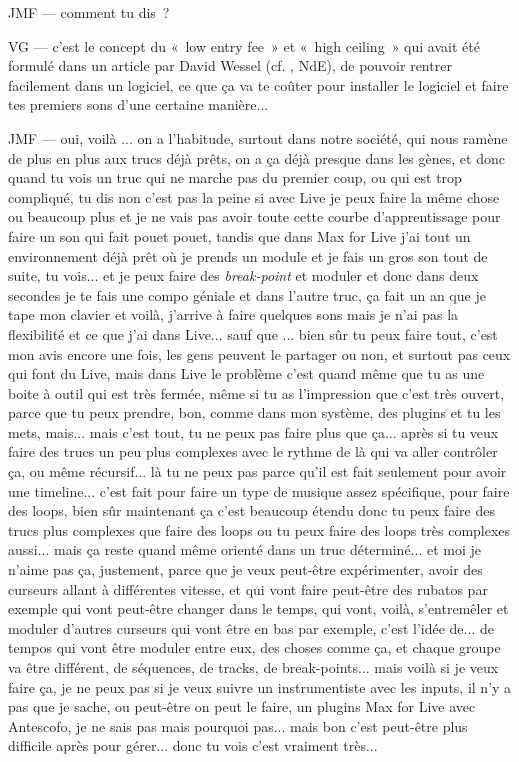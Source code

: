 JMF — comment tu dis ? 

VG — c'est le concept du « low entry fee » et « high ceiling » qui avait été formulé dans un article par David Wessel (cf. \cite{wessel_problems_2001}, NdE), de pouvoir rentrer facilement dans un logiciel, ce que ça va te coûter pour installer le logiciel et faire tes premiers sons d'une certaine manière... 

JMF — oui, voilà ... on a l'habitude, surtout dans notre société, qui nous ramène de plus en plus aux trucs déjà prêts, on a ça déjà presque dans les gènes, et donc quand tu vois un truc qui ne marche pas du premier coup, ou qui est trop compliqué, tu dis non c'est pas la peine si avec Live je peux faire la même chose ou beaucoup plus et je ne vais pas avoir toute cette courbe d'apprentissage pour faire un son qui fait pouet pouet, tandis que dans Max for Live j'ai tout un environnement déjà prêt où je prends un module et je fais un gros son tout de suite, tu vois... et je peux faire des \textit{break-point} et moduler et donc dans deux secondes je te fais une compo géniale et dans l'autre truc, ça fait un an que je tape mon clavier et voilà, j'arrive à faire quelques sons mais je n'ai pas la flexibilité et ce que j'ai dans Live... sauf que ... bien sûr tu peux faire tout, c'est mon avis encore une fois, les gens peuvent le partager ou non, et surtout pas ceux qui font du Live, mais dans Live le problème c'est quand même que tu as une boite à outil qui est très fermée, même si tu as l'impression que c'est très ouvert, parce que tu peux prendre, bon, comme dans mon système, des plugins et tu les mets, mais... mais c'est tout, tu ne peux pas faire plus que ça... après si tu veux faire des trucs un peu plus complexes avec le rythme de là qui va aller contrôler ça, ou même récursif... là tu ne peux pas parce qu'il est fait seulement pour avoir une timeline... c'est fait pour faire un type de musique assez spécifique, pour faire des loops, bien sûr maintenant ça c'est beaucoup étendu donc tu peux faire des trucs plus complexes que faire des loops ou tu peux faire des loops très complexes aussi... mais ça reste quand même orienté dans un truc déterminé... et moi je n'aime pas ça, justement, parce que je veux peut-être expérimenter, avoir des curseurs allant à différentes vitesse, et qui vont faire peut-être des rubatos par exemple qui vont peut-être changer dans le temps, qui vont, voilà, s'entremêler et moduler d'autres curseurs qui vont être en bas par exemple, c'est l'idée de... de tempos qui vont être moduler entre eux, des choses comme ça, et chaque groupe va être différent, de séquences, de tracks, de break-points... mais voilà si je veux faire ça, je ne peux pas si je veux suivre un instrumentiste avec les inputs, il n'y a pas que je sache, ou peut-être on peut le faire, un plugins Max for Live avec Antescofo, je ne sais pas mais pourquoi pas... mais bon c'est peut-être plus difficile après pour gérer... donc tu vois c'est vraiment très... 

